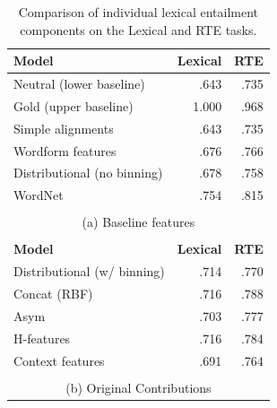 \begin{table}
  \centering
  \begin{tabular}{|lrr|}
  \hline
  {\bf Model}                & {\bf Lexical} &     {\bf RTE}  \\
  \hline\hline
  Neutral (lower baseline)    &      .643     &        .735   \\
  Gold (upper baseline)       &     1.000     &        .968   \\
  \hline
  Simple alignments           &      .643     &        .735   \\
  Wordform features           &      .676     &        .766   \\
  Distributional (no binning) &      .678     &        .758   \\
  WordNet                     &      .754     &        .815   \\
  \hline
  \multicolumn{3}{c}{}\\
  [-0.5em]
  \multicolumn{3}{c}{(a) Baseline features}\\
  \multicolumn{3}{c}{}\\
  \hline
  {\bf Model}                & {\bf Lexical} &     {\bf RTE} \\
  \hline\hline
  Distributional (w/ binning) &      .714     &        .770   \\
  \hline
  Concat (RBF)                &      .716     &        .788   \\
  Asym                        &      .703     &        .777   \\
  H-features                  &      .716     &        .784   \\
  \hline
  Context features            &      .691     &        .764   \\
  \hline
  \multicolumn{3}{c}{}\\
  [-0.5em]
  \multicolumn{3}{c}{{(b) Original Contributions}}\\
  \end{tabular}
  \caption{Comparison of individual lexical entailment components on the Lexical and RTE tasks.}
  \label{tab:indivrte}
\end{table}

